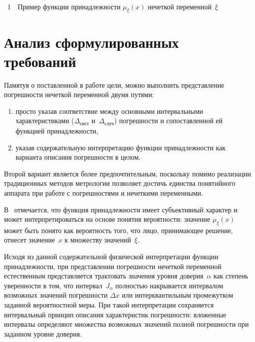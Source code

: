 \begin{multicols}{2}
\noindent
\begin{center} %
\vspace*{12pt}
\mbox{%
    \epsfxsize=56.756mm
}
\end{center}
\vspace*{3pt}
{{\figurename~1}\ \ \small{Пример функции принадлежности $\mu_\xi(x)$ нечеткой переменной~$\xi$}}

\addtocounter{figure}{1}


\section{Анализ сформулированных требований}

     Памятуя о поставленной в работе цели, можно выполнить представление 
погрешности нечеткой переменной двумя путями:
     \begin{enumerate}[(1)]
\item просто указав соответствие между основными интервальными 
характеристиками ($\Delta_{\mathrm{сист}}$ и~$\Delta_{\mathrm{случ}}$) 
погрешности и сопоставленной ей функцией принадлежности,
\item указав содержательную интерпретацию функции принадлежности как 
варианта описания погрешности в целом.
\end{enumerate}

   Второй вариант является более предпочтительным, поскольку помимо 
реализации традиционных методов метрологии позволяет достичь единства 
понятийного аппарата при работе с погрешностями и нечеткими переменными. 
  
  В~\cite{11sem} отмечается, что функция принадлежности имеет 
субъективный характер и может интерпретироваться на основе понятия 
вероятности: значение $\mu_\xi(x)$ может быть понято как вероятность того, 
что лицо, принимающее решение, отнесет значение~$x$ к множеству 
значений~$\xi$. 
  
  Исходя из данной содержательной физической интерпретации функции 
принадлежности, при представлении погрешности нечеткой переменной 
естественным представляется трактовать значения уровня доверия~$\alpha$ как 
степень уве\-рен\-ности в том, что интервал~$J_\alpha$ полностью накрывается 
интервалом возможных значений погрешности $\Delta x$ или 
интерквантильным промежутком заданной вероятностной меры. При такой 
интерпретации сохраняется интервальный принцип описания характеристик 
погрешности: вложенные интервалы определяют множества возможных 
значений полной погрешности при заданном уровне доверия.
  

\end{multicols}
